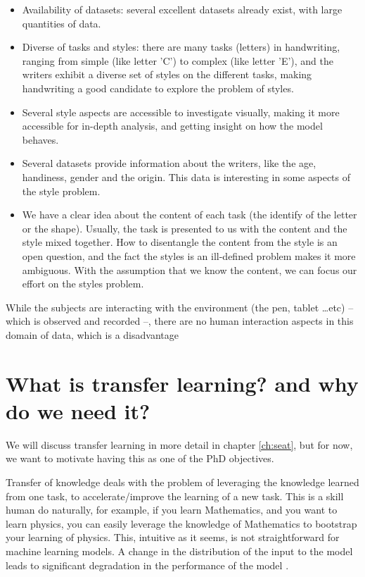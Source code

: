   \begin{itemize}
    \item Availability of datasets: several excellent datasets already exist, with large quantities of data.
    \item Diverse of tasks and styles: there are many tasks (letters) in handwriting, ranging from simple (like letter 'C') to complex (like letter 'E'), and the writers exhibit a diverse set of styles on the different tasks, making handwriting a good candidate to explore the problem of styles.
    \item Several style aspects are accessible to investigate visually, making it more accessible for in-depth analysis, and getting insight on how the model behaves.
    \item Several datasets provide information about the writers, like the age, handiness, gender and the origin. This data is interesting in some aspects of the style problem.
    \item We have a clear idea about the content of each task (the identify of the letter or the shape). Usually, the task is presented to us with the content and the style mixed together. How to disentangle the content from the style is an open question, and the fact the styles is an ill-defined problem makes it more ambiguous. With the assumption that we know the content, we can focus our effort on the styles problem.
  \end{itemize}
  While the subjects are interacting with the environment (the pen, tablet \dots etc) -- which is observed and recorded --, there are no human interaction aspects in this domain of data, which is a disadvantage

\section{What is transfer learning? and why do we need it?}
\par We will discuss transfer learning in more detail in chapter \ref{ch:seat}, but for now, we want to motivate having this as one of the PhD objectives.

\par Transfer of knowledge deals with the problem of leveraging the knowledge learned from one task, to accelerate/improve the learning of a new task. This is a skill human do naturally, for example, if you learn Mathematics, and you want to learn physics, you can easily leverage the knowledge of Mathematics to bootstrap your learning of physics. This, intuitive as it seems, is not straightforward for machine learning models. A change in the distribution of the input to the model leads to significant degradation in the performance of the model \citep{shimodaira2000improving}.

